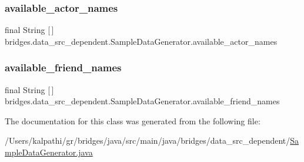 \subsubsection{\texorpdfstring{available\_actor\_names}{available\_actor\_names}}
{\footnotesize\ttfamily final String \mbox{[}$\,$\mbox{]} bridges.\+data\+\_\+src\+\_\+dependent.\+Sample\+Data\+Generator.\+available\+\_\+actor\+\_\+names\hspace{0.3cm}{\ttfamily [static]}}

\mbox{\label{classbridges_1_1data__src__dependent_1_1_sample_data_generator_a304c946018534a5a2b0049aace9d4472}} 
\subsubsection{\texorpdfstring{available\_friend\_names}{available\_friend\_names}}
{\footnotesize\ttfamily final String \mbox{[}$\,$\mbox{]} bridges.\+data\+\_\+src\+\_\+dependent.\+Sample\+Data\+Generator.\+available\+\_\+friend\+\_\+names\hspace{0.3cm}{\ttfamily [static]}}



The documentation for this class was generated from the following file\+:\begin{DoxyCompactItemize}
\item 
/\+Users/kalpathi/gr/bridges/java/src/main/java/bridges/data\+\_\+src\+\_\+dependent/\mbox{\hyperlink{_sample_data_generator_8java}{Sample\+Data\+Generator.\+java}}\end{DoxyCompactItemize}
